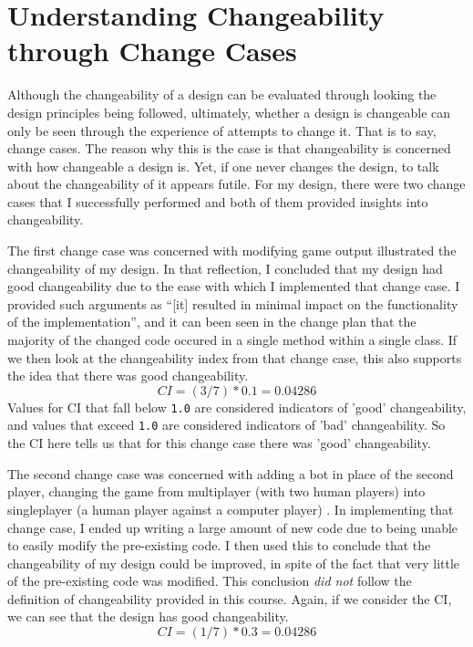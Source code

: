 \documentclass[10pt, a4paper, conference]{IEEEtran}
\begin{document}
\section{Understanding Changeability through Change Cases}
Although the changeability of a design can be evaluated through looking the
design principles being followed, ultimately, whether a design is changeable
can only be seen through the experience of attempts to change it. That is to
say, change cases. The reason why this is the case is that changeability is
concerned with how changeable a design is. Yet, if one never changes the
design, to talk about the changeability of it appears futile. For my design, 
there were two change cases that I successfully performed and both of them 
provided insights into changeability.

The first change case was concerned with modifying game output
\cite{a4-change-case} illustrated the changeability of my design. In that
reflection, I concluded that my design had good changeability due to the ease
with which I implemented that change case. I provided such arguments as ``[it]
resulted in minimal impact on the functionality of the implementation'', and it
can been seen in the change plan that the majority of the changed code occured
in a single method within a single class. If we then look at the changeability
index from that change case, this also supports the idea that there was good
changeability.
\begin{equation}
  CI = (3 / 7) * 0.1 = 0.04286
\end{equation}
Values for CI that fall below \texttt{1.0} are considered indicators of 'good'
changeability, and values that exceed \texttt{1.0} are considered indicators of
'bad' changeability. So the CI here tells us that for this change case there
was 'good' changeability. 

The second change case was concerned with adding a bot in place of the second
player, changing the game from multiplayer (with two human players) into
singleplayer (a human player against a computer player) \cite{a5-change-case}.
In implementing that change case, I ended up writing a large amount of new code
due to being unable to easily modify the pre-existing code. I then used this to
conclude that the changeability of my design could be improved, in spite of the
fact that very little of the pre-existing code was modified. This conclusion
\textit{did not} follow the definition of changeability provided in this
course. Again, if we consider the CI, we can see that the design has good
changeability.
\begin{equation}
  CI = (1 / 7) * 0.3 = 0.04286
\end{equation}
\end{document}
